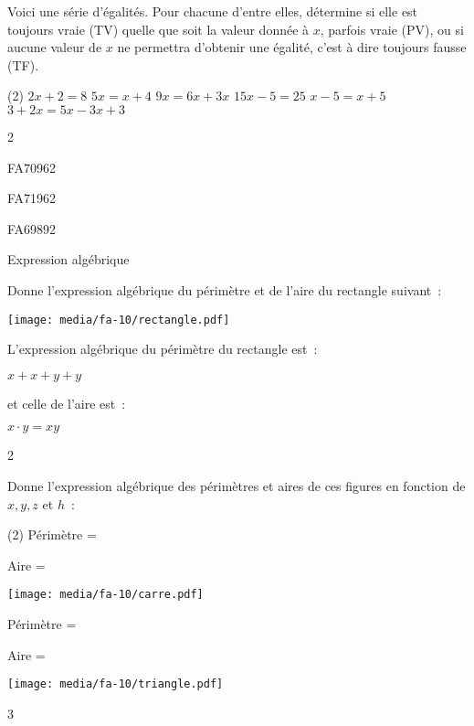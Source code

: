 \documentclass[a4paper,11pt]{report}
\begin{document}
\begin{exo}
{Voici une série d'égalités. Pour chacune d'entre elles, détermine si elle est toujours vraie (TV) quelle que soit la valeur donnée à $x$, parfois vraie (PV), ou si aucune valeur de $x$ ne permettra d'obtenir une égalité, c'est à dire toujours fausse (TF).
\begin{tasks}(2)
    \task $2x+2=8$
     \task $5x=x+4$
     \task $9x=6x+3x$
     \task $15x-5=25$
     \task $x-5=x+5$
     \task $3+2x=5x-3x+3$
\end{tasks}
}
{2}
\end{exo}

\begin{exof}{FA70}{96}{2}
\end{exof}

\begin{exof}{FA71}{96}{2}
\end{exof}

\begin{exol}{FA69}{89}{2}
\end{exol}


\begin{resolu}{Expression algébrique}
{Donne l'expression algébrique du périmètre et de l'aire du rectangle suivant~:

\begin{center}	
\texttt{[image: media/fa-10/rectangle.pdf]}
\end{center}

L'expression algébrique du périmètre du rectangle est~:

$x+x+y+y$

et celle de l'aire est~:

$x \cdot y =xy$
}
{2}
\end{resolu}

\begin{exop}{ Donne l'expression algébrique des périmètres et aires de ces figures en fonction de $x, y, z$ et $h$~:

\begin{tasks}(2)
	\task[] 
Périmètre = \hrulefill

    Aire = \hrulefill

\begin{center}
	\texttt{[image: media/fa-10/carre.pdf]}
\end{center}

    \task[]
Périmètre = \hrulefill

 Aire = \hrulefill
 
     \begin{center}
     \texttt{[image: media/fa-10/triangle.pdf]}
\end{center}

\end{tasks}

  
}
{3}
\end{exop}
\end{document}
